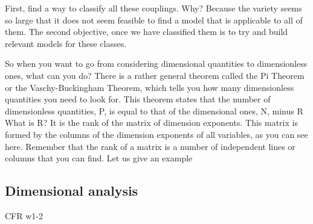 First, find a way to classify all these couplings. Why? Because the variety seems so large that it does not seem feasible to find a model that is applicable to all of them. The second objective, once we have classified them is to try and build relevant models for these classes.

So when you want to go from considering dimensional quantities to dimensionless ones, what can you do?
There is a rather general theorem called the Pi Theorem or the Vaschy-Buckingham Theorem, which tells you how many dimensionless quantities you need to look for.
This theorem states that the number of dimensionless quantities, P, is equal to that of the dimensional ones, N, minus R
What is R? It is the rank of the matrix of dimension exponents. This matrix is formed by the columns of the dimension exponents of all variables, as you can see here. Remember that the rank of a matrix is a number of independent lines or columns that you can find. Let us give an example


\subsection{Dimensional analysis}
\label{sec:dimensional}
CFR w1-2

